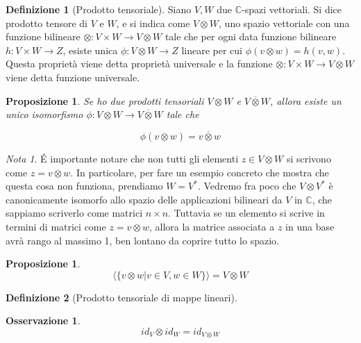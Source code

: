 \documentclass[11pt]{article}
\theoremstyle{plain}
\newtheorem{prop}[thm]{Proposizione}
\theoremstyle{definition}
\newtheorem{defn}{Definizione}[section]
\newtheorem*{rem}{Osservazione}
\theoremstyle{remark}
\newtheorem*{note}{Nota}
\newcommand{\C}{\mathbb{C}}
\begin{document}
\begin{defn}[Prodotto tensoriale]
   Siano $V, W$ due $\mathbb{C}$-spazi vettoriali. Si dice prodotto tensore di $V$ e $W$, 
   e si indica come $V\otimes W$, uno spazio vettoriale con una funzione bilineare 
   $\otimes: V \times W \to V\otimes W$ tale che per ogni data funzione bilineare $h: V\times W \to  Z$,
   esiste unica $\phi: V\otimes W \to Z$ lineare per cui $\phi(v \otimes w)=h(v,w)$.
   Questa proprietà viene detta proprietà universale e la funzione $\otimes: V \times W \to V\otimes W$
   viene detta funzione universale.



\label{defn:prodotto tensoriale}
\end{defn}


\begin{prop}
Se ho due prodotti tensoriali $V \otimes W$ e $V \overline{\otimes} W$, allora esiste un unico isomorfismo 
$\phi: V \otimes W \to V \overline{\otimes} W$ tale che

\[ \phi (v\otimes w) = v \overline{\otimes} w\]
\end{prop}


\begin{note}
\'E importante notare che non tutti gli elementi $z \in V \otimes W$ si scrivono come $z = v \otimes w$. In particolare, per fare un esempio concreto che mostra che questa cosa non funziona, prendiamo $W = V^*$. Vedremo fra poco che $V\otimes V^*$ è canonicamente isomorfo allo spazio delle applicazioni bilineari da $V$ in $\C$, che sappiamo scriverlo come matrici $n\times n$. Tuttavia se un elemento si scrive in termini di matrici come $z = v\otimes w$, allora la matrice associata a $z$ in una base avrà rango al massimo 1, ben lontano da coprire tutto lo spazio.
\end{note}


\begin{prop}
\[\langle\{ v \otimes w | v \in V, w \in W\} \rangle  = V \otimes W\]

\end{prop}


\begin{defn}[Prodotto tensoriale di mappe lineari]

\end{defn}

\begin{rem}

\[ id_V \otimes id_W = id_{V\otimes W}\]
\end{rem}
\end{document}
